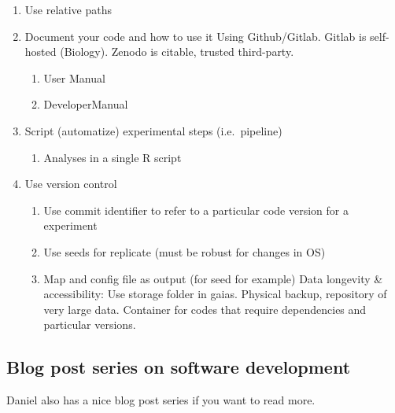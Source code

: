 \documentclass[
]{book}
\providecommand{\tightlist}{%
  \setlength{\itemsep}{0pt}\setlength{\parskip}{0pt}}
\begin{document}
\begin{enumerate}
\def\labelenumi{\arabic{enumi}.}
\item
  Use relative paths
\item
  Document your code and how to use it Using Github/Gitlab. Gitlab is
  self-hosted (Biology). Zenodo is citable, trusted third-party.

  \begin{enumerate}
  \def\labelenumii{\arabic{enumii}.}
  \item
    User Manual
  \item
    DeveloperManual
  \end{enumerate}
\item
  Script (automatize) experimental steps (i.e.~pipeline)

  \begin{enumerate}
  \def\labelenumii{\arabic{enumii}.}
  \tightlist
  \item
    Analyses in a single R script
  \end{enumerate}
\item
  Use version control

  \begin{enumerate}
  \def\labelenumii{\arabic{enumii}.}
  \item
    Use commit identifier to refer to a particular code version for
    a experiment
  \item
    Use seeds for replicate (must be robust for changes in OS)
  \item
    Map and config file as output (for seed for example) Data
    longevity \& accessibility: Use storage folder in gaias. Physical
    backup, repository of very large data. Container for codes that
    require dependencies and particular versions.
  \end{enumerate}
\end{enumerate}

\subsection{Blog post series on software development}\label{blog-post-series-on-software-development}

Daniel also has a nice blog post series if you want to read more.
\end{document}
